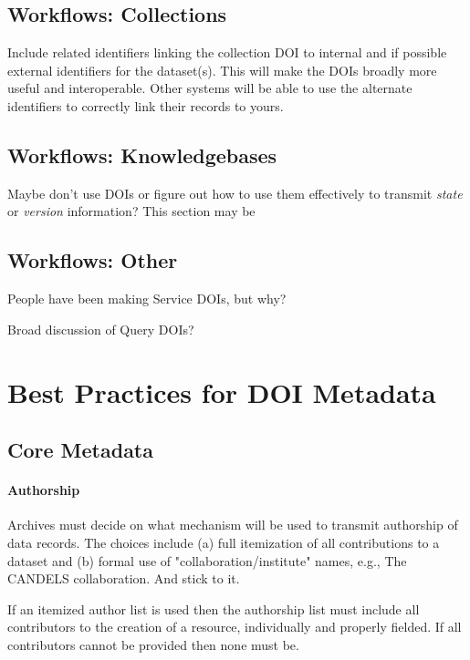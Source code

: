 \documentclass[11pt,a4paper]{ivoa}
\begin{document}
\subsection{Workflows: Collections}
Include related identifiers linking the collection DOI to internal and if possible external identifiers for the dataset(s). 
This will make the DOIs broadly more useful and interoperable.
Other systems will be able to use the alternate identifiers to correctly link their records to yours.

\subsection{Workflows: Knowledgebases}
Maybe don't use DOIs or figure out how to use them effectively to transmit \textit{state} or \textit{version} information?
This section may be 

\subsection{Workflows: Other}
People have been making Service DOIs, but why? 

Broad discussion of Query DOIs? 




\section{Best Practices for DOI Metadata}
\label{sec:bpmeta}
\subsection{Core Metadata}
\label{sec:bpmeta:core}

\paragraph{Authorship} 
Archives must decide on what mechanism will be used to transmit authorship of data records. 
The choices include (a) full itemization of all contributions to a dataset  and (b) formal use of  "collaboration/institute" names, e.g., The CANDELS collaboration. 
And stick to it.

If an itemized author list is used then the authorship list must include all contributors to the creation of a resource, individually and properly fielded.
If all contributors cannot be provided then none must be. 
\end{document}
